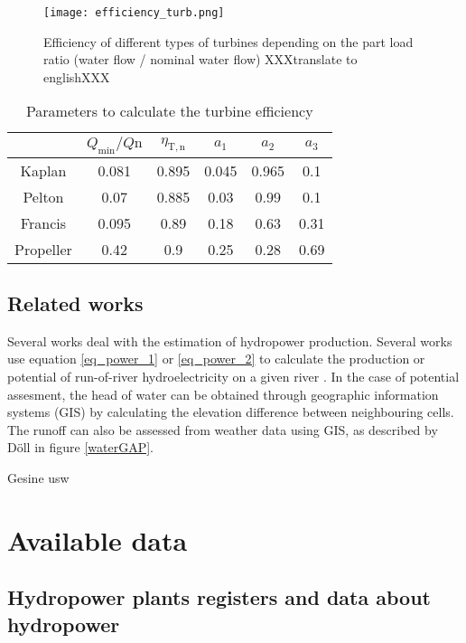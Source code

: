 \begin{figure}[H]
\texttt{[image: efficiency\_turb.png]}
\caption[Efficiency of different types of turbines depending on the part load ratio]{Efficiency of different types of turbines depending on the part load ratio (water flow / nominal water flow) \cite{raa89} XXXtranslate to englishXXX}
\centering
\label{efficiency_turb}
\end{figure}


\begin{table}
 \caption[Parameters to calculate the turbine efficiency]{Parameters to calculate the turbine efficiency \cite{quaschning}}
 \label{eff_param}
 \centering
 \begin{tabular}{|c|c|c|c|c|c|}
  \cline{2-6}
  \multicolumn{1}{c|}{}&$Q_\mathrm{min} / Q\mathrm{n}$ & $\eta_\mathrm{T,n}$& $a_\mathrm{1}$ & $a_\mathrm{2}$&$a_\mathrm{3}$ \\ 
  \hline
  Kaplan & 0.081& 0.895& 0.045 &0.965& 0.1 \\
  Pelton & 0.07& 0.885& 0.03& 0.99& 0.1\\
  Francis &0.095 &0.89 &0.18 &0.63 &0.31 \\
  Propeller &0.42 &0.9 &0.25 &0.28 &0.69\\
  \hline
 \end{tabular}
\end{table}

\subsection{Related works}
Several works deal with the estimation of hydropower production. 
Several works use equation \ref{eq_power_1} or \ref{eq_power_2} to calculate the production or potential of run-of-river hydroelectricity on a given river \cite{hammid} \cite{bayazit} \cite{garrido}. In the case of potential assesment, the head of water can be obtained through geographic information systems (GIS) by calculating the elevation difference between neighbouring cells. The runoff can also be assessed from weather data using GIS, as described by Döll in figure \ref{waterGAP}.


Gesine usw

\section{Available data}

\subsection{Hydropower plants registers and data about hydropower}
\label{hpp_register}


